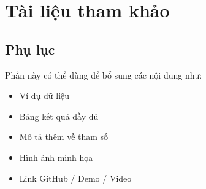 \documentclass[12pt]{ai_conquer2026}
\begin{document}
\newpage
\section{Tài liệu tham khảo}
\label{section:references}
\nocite{*}
\vspace{-3.2em}
\printbibliography

\newpage
\begin{appendices}

\section{Phụ lục}

Phần này có thể dùng để bổ sung các nội dung như:
\begin{itemize}
    \item Ví dụ dữ liệu
    \item Bảng kết quả đầy đủ
    \item Mô tả thêm về tham số
    \item Hình ảnh minh họa
    \item Link GitHub / Demo / Video
\end{itemize}

\end{appendices}
\end{document}

